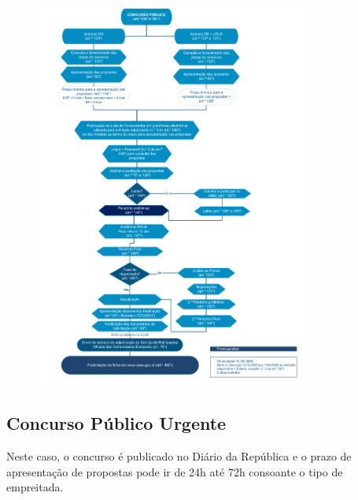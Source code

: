 \documentclass{book}
\begin{document}
	\begin{figure}[H]
		\centering
		\includegraphics[width=0.8\textwidth]{concurso-publico_ccp.png}
		\caption{}
		\label{}
	\end{figure}
	
	\newpage
	\subsection*{Concurso Público Urgente}
	
	Neste caso, o concurso é publicado no Diário da República e o prazo de apresentação de propostas pode ir de 24h até 72h consoante o tipo de empreitada. 
	
\end{document}
